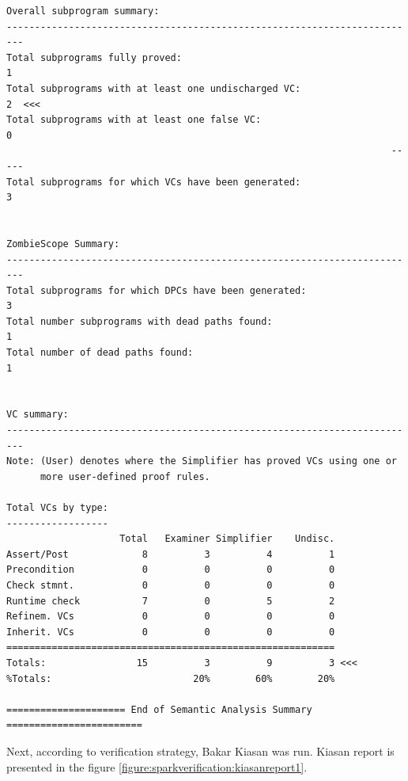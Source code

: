 \begin{lstlisting}[frame=single, gobble=0, caption={POGS report}]
Overall subprogram summary:
-------------------------------------------------------------------------
Total subprograms fully proved:                                         1
Total subprograms with at least one undischarged VC:                    2  <<<
Total subprograms with at least one false VC:                           0
                                                                    -----
Total subprograms for which VCs have been generated:                    3


ZombieScope Summary:
-------------------------------------------------------------------------
Total subprograms for which DPCs have been generated:                   3
Total number subprograms with dead paths found:                         1
Total number of dead paths found:                                       1


VC summary:
-------------------------------------------------------------------------
Note: (User) denotes where the Simplifier has proved VCs using one or
      more user-defined proof rules.

Total VCs by type:
------------------
                    Total   Examiner Simplifier    Undisc.
Assert/Post             8          3          4          1
Precondition            0          0          0          0
Check stmnt.            0          0          0          0
Runtime check           7          0          5          2
Refinem. VCs            0          0          0          0
Inherit. VCs            0          0          0          0
==========================================================
Totals:                15          3          9          3 <<<
%Totals:                         20%        60%        20%

===================== End of Semantic Analysis Summary ========================
\end{lstlisting}
\label{listing:pcapump_dosemonitor_pogs}
\doublespacing

Next, according to verification strategy, Bakar Kiasan was run. Kiasan report is presented in the figure \ref{figure:sparkverification:kiasanreport1}.

